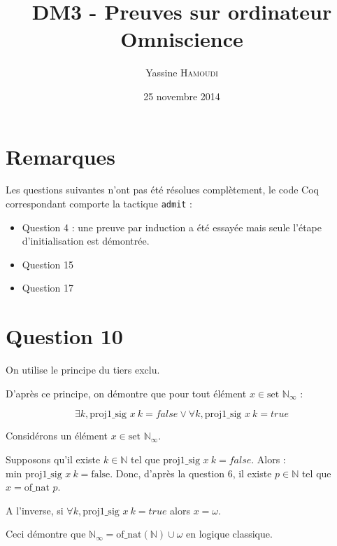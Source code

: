\documentclass[a4paper,10pt]{article} %
\title{DM3 - Preuves sur ordinateur \\ Omniscience}
\author{ {\Large Yassine \textsc{Hamoudi}}}
\date{25 novembre 2014}
\theoremstyle{definition} %
\newcommand{\N}{\mathbb{N}}
\newcommand{\sN}{\text{set }\N_{\infty}}
\newcommand{\pS}{\text{proj1\_sig }}
\begin{document}
\maketitle


\section{Remarques}

Les questions suivantes n'ont pas été résolues complètement, le code Coq correspondant comporte la tactique \texttt{admit} :
\begin{itemize}
 \item Question 4 : une preuve par induction a été essayée mais seule l'étape d'initialisation est démontrée.
 \item Question 15
 \item Question 17
\end{itemize}




\section{Question 10}

On utilise le principe du tiers exclu.

D'après ce principe, on démontre que pour tout élément $x \in \sN$ :

\[ \exists k, \pS x \ k = false \vee \forall k, \pS x \ k = true\]

Considérons un élément $x \in \sN$.

Supposons qu'il existe $k \in \N$ tel que $\pS x \ k = false$. Alors : $\text{min } \pS x \ k = \text{false}$. Donc, d'après la question 6, il existe $p \in \N$ tel que $x = \text{of\_nat } p$.

A l'inverse, si $\forall k, \pS x \ k = true$ alors $x = \omega$.

Ceci démontre que $\N_{\infty} = \text{of\_nat}(\N) \cup \omega$ en logique classique.

\end{document}
